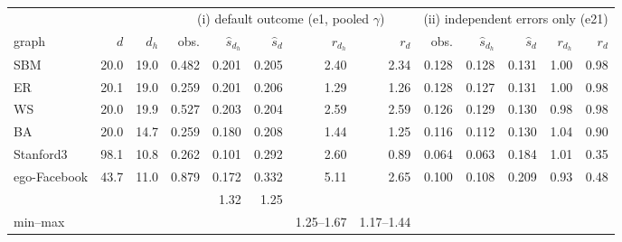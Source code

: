 \begin{tabular}{lrrrrrrrrrrrr}
\toprule
 & & & \multicolumn{5}{c}{(i) default outcome (e1, pooled $\gamma$)} & \multicolumn{5}{c}{(ii) independent errors only (e21)} \\
\cmidrule(lr){4-8}\cmidrule(lr){9-13}
graph & $d$ & $d_h$ & obs. & $\hat s_{d_h}$ & $\hat s_{d}$ & $r_{d_h}$ & $r_{d}$ & obs. & $\hat s_{d_h}$ & $\hat s_{d}$ & $r_{d_h}$ & $r_{d}$ \\
\midrule
SBM & 20.0 & 19.0 & 0.482 & 0.201 & 0.205 & 2.40 & 2.34 & 0.128 & 0.128 & 0.131 & 1.00 & 0.98 \\
ER & 20.1 & 19.0 & 0.259 & 0.201 & 0.206 & 1.29 & 1.26 & 0.128 & 0.127 & 0.131 & 1.00 & 0.98 \\
WS & 20.0 & 19.9 & 0.527 & 0.203 & 0.204 & 2.59 & 2.59 & 0.126 & 0.129 & 0.130 & 0.98 & 0.98 \\
BA & 20.0 & 14.7 & 0.259 & 0.180 & 0.208 & 1.44 & 1.25 & 0.116 & 0.112 & 0.130 & 1.04 & 0.90 \\
Stanford3 & 98.1 & 10.8 & 0.262 & 0.101 & 0.292 & 2.60 & 0.89 & 0.064 & 0.063 & 0.184 & 1.01 & 0.35 \\
ego-Facebook & 43.7 & 11.0 & 0.879 & 0.172 & 0.332 & 5.11 & 2.65 & 0.100 & 0.108 & 0.209 & 0.93 & 0.48 \\
\addlinespace
\multicolumn{3}{l}{e3 sweeps (37): median} & & & & 1.32 & 1.25 & & & & \\
\multicolumn{3}{l}{\hspace{2.2em}min--max} & & & & 1.25--1.67 & 1.17--1.44 & & & & \\
\bottomrule
\end{tabular}
